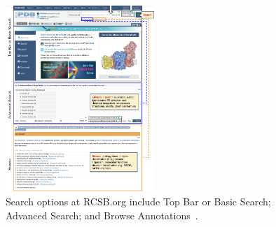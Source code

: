 \documentclass{report}
\begin{document}
\begin{figure}[H]
    \centering
    \includegraphics[width=0.5\textwidth]{PDB Site.png}
    \caption{\label{fig:PDB}Search options at RCSB.org include Top Bar or Basic Search; Advanced Search; and Browse Annotations~\cite{burley1_rcsb_2022}.}
\end{figure}
\end{document}
